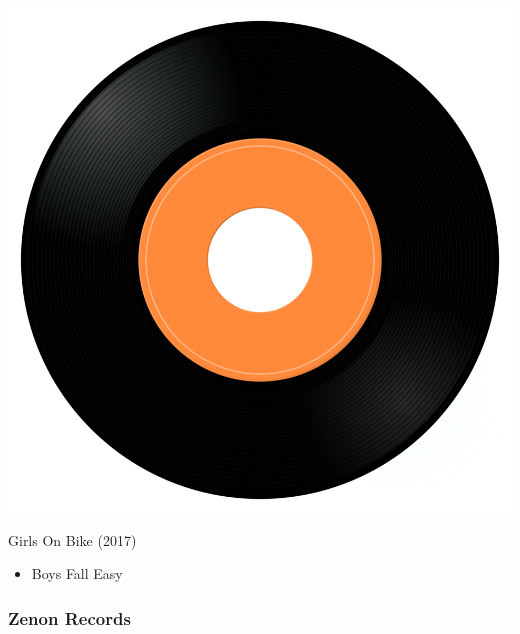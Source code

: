 \begin{minipage}[t]{0.25\textwidth}\vspace{0pt}
\captionsetup{type=figure}
\includegraphics[width=\textwidth]{Images/cover.png}
\caption*{Girls On Bike (2017)}
\end{minipage}
\begin{minipage}[t]{0.25\textwidth}\vspace{0pt}
\begin{itemize}[nosep,leftmargin=1em,labelwidth=*,align=left]
	\setlength{\itemsep}{0pt}
	\item Boys Fall Easy
\end{itemize}
\end{minipage}

\subsubsection{Zenon Records}


